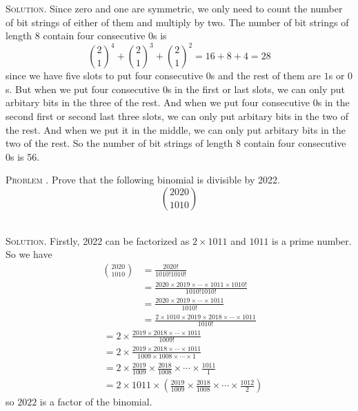 \documentclass[12pt, a4paper, oneside]{article}
\newcounter{problemname}
\newenvironment{problem}{\stepcounter{problemname}\par\noindent\textsc{Problem \arabic{problemname}. }}{\\\par}
\newenvironment{solution}{\par\noindent\textsc{Solution. }}{\\\par}
\begin{document}
\begin{solution}
    Since zero and one are symmetric, we only need to count the number of bit strings of either of them and multiply by two.
    The number of bit strings of length $8$ contain four consecutive $0$s is
    \[\binom{2}{1}^4 + \binom{2}{1}^3 + \binom{2}{1}^2 = 16 + 8 + 4 = 28\]
    since we have five slots to put four consecutive $0$s and the rest of them are $1$s or $0$s.
    But when we put four consecutive $0$s in the first or last slots, we can only put arbitary bits in the three of the rest.
    And when we put four consecutive $0$s in the second first or second last three slots, we can only put arbitary bits in the two of the rest.
    And when we put it in the middle, we can only put arbitary bits in the two of the rest.
    So the number of bit strings of length $8$ contain four consecutive $0$s is 56.
\end{solution}

\begin{problem}
    Prove that the following binomial is divisible by 2022.
    \[\binom{2020}{1010}\]
\end{problem}

\begin{solution}
    Firstly, 2022 can be factorized as $2\times 1011$ and $1011$ is a prime number. So we have
    \begin{align*}
        \binom{2020}{1010} &= \frac{2020!}{1010!1010!} \\
        &= \frac{2020\times 2019\times \cdots \times 1011\times 1010!}{1010!1010!} \\
        &= \frac{2020\times 2019\times \cdots \times 1011}{1010!} \\
        &= \frac{2\times 1010\times 2019\times 2018\times \cdots \times 1011}{1010!}
    \end{align*}
    \begin{align*}
        &= 2\times \frac{2019\times 2018\times \cdots \times 1011}{1009!} \\
        &= 2\times \frac{2019\times 2018\times \cdots \times 1011}{1009\times 1008\times \cdots \times 1} \\
        &= 2\times \frac{2019}{1009}\times \frac{2018}{1008}\times \cdots \times \frac{1011}{1} \\
        &= \boxed{2\times 1011} \times \left(\frac{2019}{1009}\times \frac{2018}{1008}\times \cdots \times \frac{1012}{2} \right)
    \end{align*}
    so $2022$ is a factor of the binomial.
\end{solution}
\end{document}
